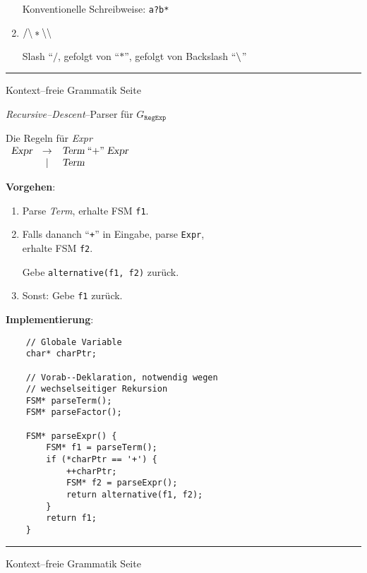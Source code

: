 \begin{slide}{}
\begin{enumerate}
      Konventionelle Schreibweise: \texttt{a?b*}
\item $\mathtt{/\symbol{92}*\symbol{92}\symbol{92}}$

      Slash ``$\mathtt{/}$, gefolgt von ``$\mathtt{*}$'', gefolgt von Backslash ``$\mathtt{\symbol{92}}$''
\end{enumerate}


\vspace*{\fill}
\tiny \addtocounter{mypage}{1}
\rule{17cm}{1mm}
Kontext--freie Grammatik  \hspace*{\fill} Seite 
\end{slide}


\begin{slide}{}
\normalsize

\begin{center}
\emph{Recursive--Descent}--Parser f\"ur $G_{\mathtt{RegExp}}$
\end{center}
\vspace*{0.5cm}

\footnotesize
Die Regeln f\"ur \textsl{Expr} \\[0.3cm]
\hspace*{1.3cm} $
\begin{array}{lcl}
\textsl{Expr} & \rightarrow & \textsl{Term}\; ``\mathtt{+}\cq \;\textsl{Expr}  \\
              & |           & \textsl{Term}
\end{array}$

\textbf{Vorgehen}:
\begin{enumerate}
\item Parse \textsl{Term}, erhalte FSM \texttt{f1}.
\item Falls dananch ``\texttt{+}'' in Eingabe, parse \texttt{Expr}, \\
      erhalte FSM \texttt{f2}.

      Gebe \texttt{alternative(f1, f2)} zur\"uck.
\item Sonst: Gebe \texttt{f1} zur\"uck.
\end{enumerate}
\textbf{Implementierung}:
\begin{verbatim}
    // Globale Variable
    char* charPtr;

    // Vorab--Deklaration, notwendig wegen 
    // wechselseitiger Rekursion
    FSM* parseTerm();
    FSM* parseFactor();

    FSM* parseExpr() {
        FSM* f1 = parseTerm();
        if (*charPtr == '+') {
            ++charPtr;
            FSM* f2 = parseExpr();
            return alternative(f1, f2);
        }
        return f1;
    }
\end{verbatim}

\vspace*{\fill}
\tiny \addtocounter{mypage}{1}
\rule{17cm}{1mm}
Kontext--freie Grammatik  \hspace*{\fill} Seite 
\end{slide}

